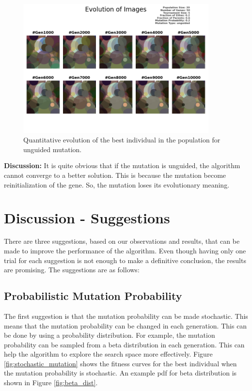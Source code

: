 \documentclass{assignment}
\begin{document}
\begin{figure}[!htb]
    \centering
    \includegraphics[width=0.9\textwidth]{figures/images_output_20_50_5_0.2_0.6_0.2_unguided.png}
    \caption{Quantitative evolution of the best individual in the population for unguided mutation.}
    \label{fig:unguided_image}
\end{figure}

\textbf{Discussion:} It is quite obvious that if the mutation is unguided, the algorithm cannot converge to a better solution. This is because the mutation become reinitialization of the gene. So, the mutation loses its evolutionary meaning.

\section{Discussion - Suggestions}

There are three suggestions, based on our observations and results, that can be made to improve the performance of the algorithm. Even though having only one trial for each suggestion is not enough to make a definitive conclusion, the results are promising. The suggestions are as follows:

\subsection{Probabilistic Mutation Probability}
The first suggestion is that the mutation probability can be made stochastic. This means that the mutation probability can be changed in each generation. This can be done by using a probability distribution. For example, the mutation probability can be sampled from a beta distribution in each generation. This can help the algorithm to explore the search space more effectively. Figure \ref{fig:stochastic_mutation} shows the fitness curves for the best individual when the mutation probability is stochastic. An example pdf for beta distribution is shown in Figure \ref{fig:beta_dist}.
\end{document}
